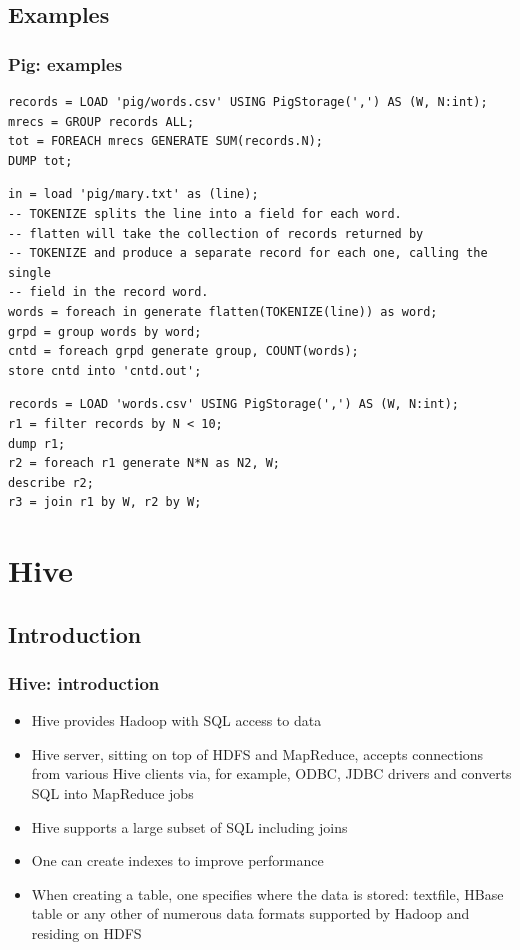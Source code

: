 \documentclass{beamer}
\begin{document}
\subsection{Examples}
\begin{frame}[fragile]
 \frametitle{Pig: examples}
{\color{mycolorcode}
  \begin{lstlisting}[frame=single, basicstyle=\tiny]
records = LOAD 'pig/words.csv' USING PigStorage(',') AS (W, N:int);
mrecs = GROUP records ALL;
tot = FOREACH mrecs GENERATE SUM(records.N);
DUMP tot;
  \end{lstlisting}

  \begin{lstlisting}[frame=single, basicstyle=\tiny]
in = load 'pig/mary.txt' as (line);
-- TOKENIZE splits the line into a field for each word.
-- flatten will take the collection of records returned by
-- TOKENIZE and produce a separate record for each one, calling the single
-- field in the record word.
words = foreach in generate flatten(TOKENIZE(line)) as word;
grpd = group words by word;
cntd = foreach grpd generate group, COUNT(words);
store cntd into 'cntd.out';
  \end{lstlisting}

  \begin{lstlisting}[frame=single, basicstyle=\tiny]
records = LOAD 'words.csv' USING PigStorage(',') AS (W, N:int);
r1 = filter records by N < 10;
dump r1;
r2 = foreach r1 generate N*N as N2, W;
describe r2;
r3 = join r1 by W, r2 by W;
  \end{lstlisting}
}

\end{frame}


\section{Hive}
\subsection{Introduction}
\begin{frame}
 \frametitle{Hive: introduction}
 \begin{itemize}
  \item Hive provides Hadoop with SQL access to data
  \item Hive server, sitting on top of HDFS and MapReduce, accepts connections from various Hive clients via, for example, ODBC, JDBC drivers and converts SQL into MapReduce jobs
  \item Hive supports a large subset of SQL including joins
  \item One can create indexes to improve performance
  \item When creating a table, one specifies where the data is stored: textfile, HBase table or any other of numerous data formats supported by Hadoop and residing on HDFS
 \end{itemize}

\end{frame}
\end{document}
